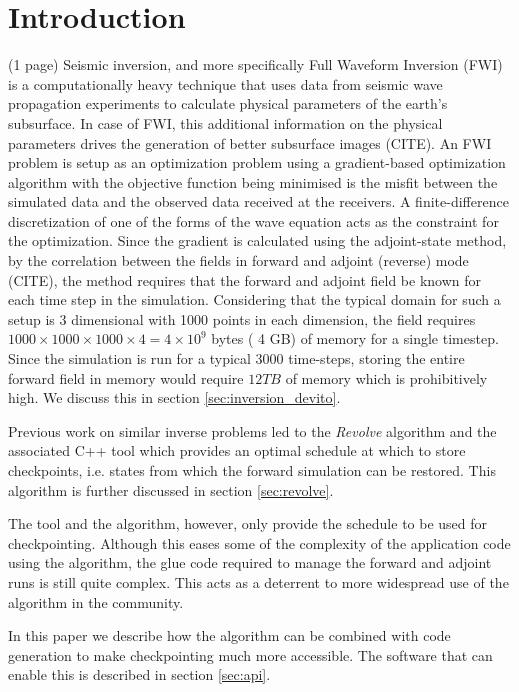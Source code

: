 \documentclass[sigconf]{acmart}
\begin{document}
\section{Introduction}
(1 page)
Seismic inversion, and more specifically Full Waveform Inversion (FWI)
is a computationally heavy technique that uses data from seismic wave
propagation experiments to calculate physical parameters of the
earth's subsurface. In case of FWI, this additional information on the
physical parameters drives the generation of better subsurface
images (CITE). An FWI problem is setup as an optimization problem using
a gradient-based optimization algorithm with the objective function
being minimised is the misfit between the simulated data and the
observed data received at the receivers. A finite-difference
discretization of one of the forms of the wave equation acts as the
constraint for the optimization. Since the gradient is calculated using the
adjoint-state method, by the correlation between the fields in forward
and adjoint (reverse) mode (CITE), the method requires that the forward and
adjoint field be known for each time step in the
simulation. Considering that the typical domain for such a setup is 3
dimensional with 1000 points in each dimension, the field requires
$1000 \times 1000 \times 1000 \times 4 = 4 \times 10^{9} $ bytes ( 4
GB) of memory for a single timestep. Since the simulation is run for a
typical $3000$ time-steps, storing the entire forward field in memory
would require $12 TB$ of memory which is prohibitively high. We
discuss this in section \ref{sec:inversion_devito}. 

Previous work on similar inverse problems led to the \emph{Revolve}
algorithm \cite{griewank2000} and the associated C++ tool which
provides an optimal schedule at which to store checkpoints,
i.e. states from which the forward simulation can be restored. This
algorithm is further discussed in section \ref{sec:revolve}.

The tool and the algorithm, however, only provide the schedule to be
used for checkpointing. Although this eases some of the complexity of
the application code using the algorithm, the glue code required to
manage the forward and adjoint runs is still quite complex. This acts
as a deterrent to more widespread use of the algorithm in the
community. 

In this paper we describe how the algorithm can be combined with code
generation to make checkpointing much more accessible. The software that
can enable this is described in section \ref{sec:api}. 
\end{document}
